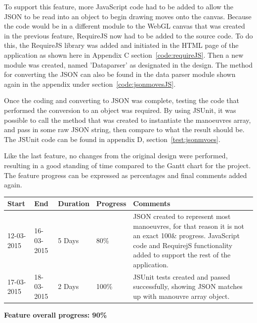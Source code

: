 To support this feature, more JavaScript code had to be added to allow the JSON to be read into an object to begin drawing moves onto the canvas. Because the code would be in a different module to the WebGL canvas that was created in the previous feature, RequireJS now had to be added to the source code. To do this, the RequireJS library was added and initiated in the HTML page of the application as shown here in Appendix C section~\ref{code:requireJS}. Then a new module was created, named 'Dataparser' as designated in the design. The method for converting the JSON can also be found in the data parser module shown again in the appendix under section~\ref{code:jsonmovesJS}.

Once the coding and converting to JSON was complete, testing the code that performed the conversion to an object was required. By using JSUnit, it was possible to call the method that was created to instantiate the manoeuvres array, and pass in some raw JSON string, then compare to what the result should be. The JSUnit code can be found in appendix D, section~\ref{test:jsonmvoes}.

Like the last feature, no changes from the original design were performed, resulting in a good standing of time compared to the Gantt chart for the project. The feature progress can be expressed as percentages and final comments added again.

\begin{table}[h]
\begin{tabular}{|l|l|l|l|p{7cm}|}
\hline
\textbf{Start} & \textbf{End} & \textbf{Duration} & \textbf{Progress} & \textbf{Comments}                                                                                                     \\ \hline
12-03-2015     & 16-03-2015   & 5 Days            & 80\%             & JSON created to represent most manoeuvres, for that reason it is not an exact 100\& progress. JavaScript code and RequirejS functionality added to support the rest of the application. \\ \hline
17-03-2015     & 18-03-2015   & 2 Days            & 100\%             & JSUnit tests created and passed successfully, showing JSON matches up with manouvre array object.\\ \hline
\end{tabular}
\end{table}

\textbf{Feature overall progress: 90\%}

